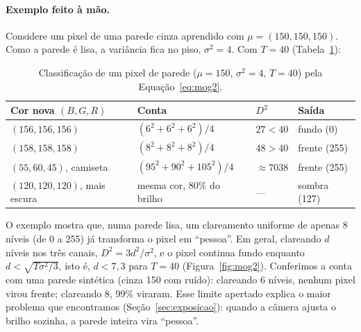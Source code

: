 \paragraph{Exemplo feito à mão.} Considere um pixel de uma parede cinza
aprendido com $\mu = (150, 150, 150)$. Como a parede é lisa, a
variância fica no piso, $\sigma^2 = 4$. Com $T = 40$
(Tabela~\ref{tab:exemplo}):

\begin{table}[H]
\centering
\caption{Classificação de um pixel de parede ($\mu = 150$, $\sigma^2 = 4$, $T = 40$) pela Equação~\ref{eq:mog2}.}
\label{tab:exemplo}
\small
\begin{tabular}{llll}
\toprule
Cor nova $(B,G,R)$ & Conta & $D^2$ & Saída \\
\midrule
$(156, 156, 156)$ & $(6^2+6^2+6^2)/4$ & $27 < 40$ & fundo (0) \\
$(158, 158, 158)$ & $(8^2+8^2+8^2)/4$ & $48 > 40$ & frente (255) \\
$(55, 60, 45)$, camiseta & $(95^2+90^2+105^2)/4$ & $\approx 7038$ & frente (255) \\
$(120, 120, 120)$, mais escura & mesma cor, 80\% do brilho & --- & sombra (127) \\
\bottomrule
\end{tabular}
\end{table}

O exemplo mostra que, numa parede lisa, um clareamento uniforme de
apenas 8 níveis (de 0 a 255) já transforma o pixel em ``pessoa''. Em
geral, clareando $d$ níveis nos três canais, $D^2 = 3d^2/\sigma^2$, e o
pixel continua fundo enquanto $d < \sqrt{T\sigma^2/3}$, isto é,
$d < 7{,}3$ para $T = 40$ (Figura~\ref{fig:mog2}). Conferimos a conta
com uma parede sintética (cinza 150 com ruído): clareando 6 níveis,
nenhum pixel virou frente; clareando 8, 99\% viraram. Esse limite
apertado explica o maior problema que encontramos
(Seção~\ref{sec:exposicao}): quando a câmera ajusta o brilho sozinha,
a parede inteira vira ``pessoa''.

